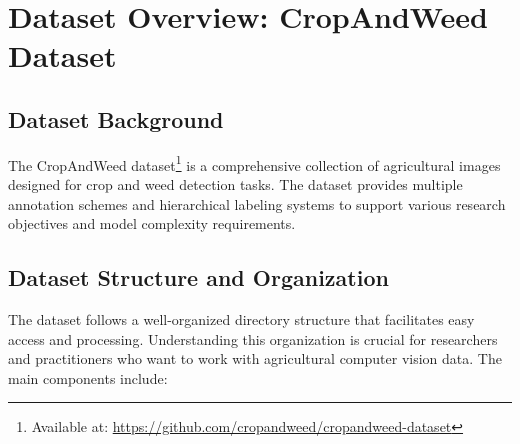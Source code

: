 \section{Dataset Overview: CropAndWeed Dataset}
\subsection{Dataset Background}

The CropAndWeed dataset\footnote{Available at: \url{https://github.com/cropandweed/cropandweed-dataset}} is a comprehensive collection of agricultural images designed for crop and weed detection tasks. The dataset provides multiple annotation schemes and hierarchical labeling systems to support various research objectives and model complexity requirements.

\subsection{Dataset Structure and Organization}

The dataset follows a well-organized directory structure that facilitates easy access and processing. Understanding this organization is crucial for researchers and practitioners who want to work with agricultural computer vision data. The main components include:

